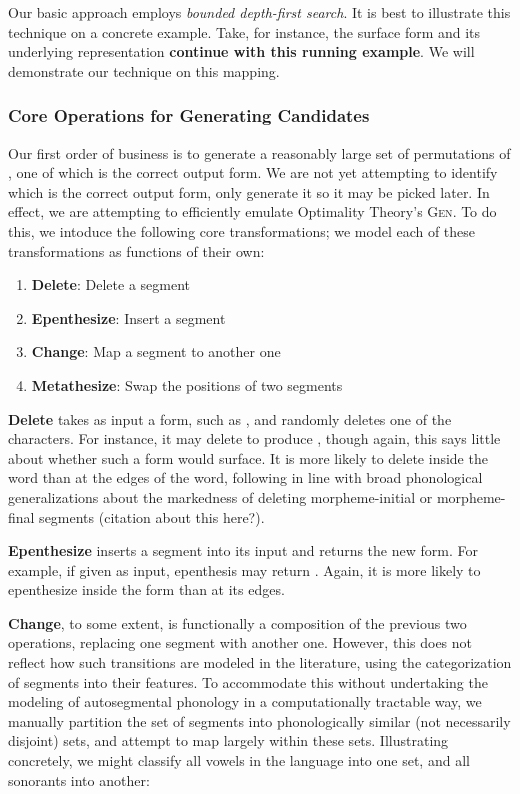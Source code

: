 \documentclass[12pt]{article}
\begin{document}
Our basic approach employs \textit{bounded depth-first search}. It is best to
illustrate this technique on a concrete example. Take, for instance, the
surface form \textipa{[sol\'u]} and its underlying representation
 \textbf{continue with this running example}. We will
demonstrate our technique on this mapping.

\subsubsection{Core Operations for Generating Candidates}

Our first order of business is to generate a reasonably large set of
permutations of , one of which is the correct output form.
We are not yet attempting to identify which is the correct output form, only
generate it so it may be picked later. In effect, we are attempting to
efficiently emulate Optimality Theory's \textsc{Gen}. To do this, we intoduce
the following core transformations; we model each of these transformations as
functions of their own:

\begin{enumerate}
    \item \textbf{Delete}: Delete a segment
    \item \textbf{Epenthesize}: Insert a segment
    \item \textbf{Change}: Map a segment to another one
    \item \textbf{Metathesize}: Swap the positions of two segments
\end{enumerate}

\textbf{Delete} takes as input a form, such as \textipa{[sol\'u]}, and
randomly deletes one of the characters. For instance, it may delete
\textipa{[o]} to produce \textipa{[sl\'u]}, though again, this says little
about whether such a form would surface. It is more likely to delete inside the
word than at the edges of the word, following in line with broad phonological
generalizations about the markedness of deleting morpheme-initial or
morpheme-final segments (citation about this here?).

\textbf{Epenthesize} inserts a segment into its input and returns the new form.
For example, if given \textipa{[sol\'u]} as input, epenthesis may return
\textipa{[sool\'u]}. Again, it is more likely to epenthesize inside the form
than at its edges.

\textbf{Change}, to some extent, is functionally a composition of the previous
two operations, replacing one segment with another one. However, this does not
reflect how such transitions are modeled in the literature, using the
categorization of segments into their features. To accommodate this without
undertaking the modeling of autosegmental phonology
\cite{goldsmith1990autosegmental} in a computationally tractable way, we
manually partition the set of segments into phonologically similar (not
necessarily disjoint) sets, and attempt to map largely within these sets.
Illustrating concretely, we might classify all vowels in the language into one
set, and all sonorants into another:
\end{document}
